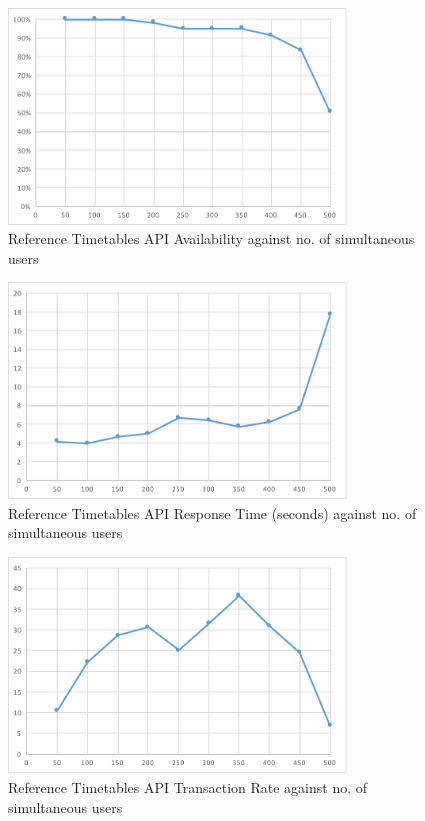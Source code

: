 \begin{figure}
\centering
\includegraphics[width=0.8\textwidth]{figures/siege_tfl_api_availability_against_users.pdf}
\caption{\label{fig:siege_tfl_api_availability} Reference Timetables API Availability against no. of simultaneous users}
\end{figure}

\begin{figure}
\centering
\includegraphics[width=0.8\textwidth]{figures/siege_tfl_response_time_against_users.pdf}
\caption{\label{fig:siege_tfl_api_response_time} Reference Timetables API Response Time (seconds) against no. of simultaneous users}
\end{figure}

\begin{figure}
\centering
\includegraphics[width=0.8\textwidth]{figures/siege_tfl_transfer_rate_against_users.pdf}
\caption{\label{fig:siege_tfl_api_transfer_rate} Reference Timetables API Transaction Rate against no. of simultaneous users}
\end{figure}

